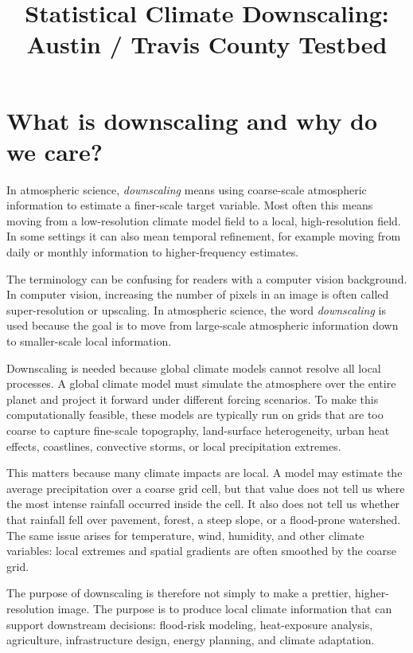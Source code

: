 \documentclass[11pt]{article}
\title{Statistical Climate Downscaling: Austin / Travis County Testbed}
\author{}
\date{}
\begin{document}
\maketitle

\section{What is downscaling and why do we care?}

In atmospheric science, \emph{downscaling} means using coarse-scale atmospheric information to estimate a finer-scale target variable. Most often this means moving from a low-resolution climate model field to a local, high-resolution field. In some settings it can also mean temporal refinement, for example moving from daily or monthly information to higher-frequency estimates.

The terminology can be confusing for readers with a computer vision background. In computer vision, increasing the number of pixels in an image is often called super-resolution or upscaling. In atmospheric science, the word \emph{downscaling} is used because the goal is to move from large-scale atmospheric information down to smaller-scale local information.

Downscaling is needed because global climate models cannot resolve all local processes. A global climate model must simulate the atmosphere over the entire planet and project it forward under different forcing scenarios. To make this computationally feasible, these models are typically run on grids that are too coarse to capture fine-scale topography, land-surface heterogeneity, urban heat effects, coastlines, convective storms, or local precipitation extremes.

This matters because many climate impacts are local. A model may estimate the average precipitation over a coarse grid cell, but that value does not tell us where the most intense rainfall occurred inside the cell. It also does not tell us whether that rainfall fell over pavement, forest, a steep slope, or a flood-prone watershed. The same issue arises for temperature, wind, humidity, and other climate variables: local extremes and spatial gradients are often smoothed by the coarse grid.

The purpose of downscaling is therefore not simply to make a prettier, higher-resolution image. The purpose is to produce local climate information that can support downstream decisions: flood-risk modeling, heat-exposure analysis, agriculture, infrastructure design, energy planning, and climate adaptation.
\end{document}
